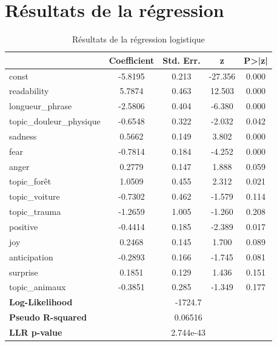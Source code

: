 \documentclass[12pt,a4paper,oneside,titlepage]{book} %
\begin{document}
\section{Résultats de la régression}
\begin{table}[htbp]
	\centering
	\caption{Résultats de la régression logistique}
	\begin{tabular}{lcccc}
		\toprule
		& \textbf{Coefficient} & \textbf{Std. Err.} & \textbf{z} & \textbf{P>|z|} \\
		\midrule
		const                        & -5.8195 & 0.213 & -27.356 & 0.000 \\
		readability & 5.7874  & 0.463 & 12.503  & 0.000 \\
		longueur\_phrase             & -2.5806 & 0.404 & -6.380  & 0.000 \\
		topic\_douleur\_physique                     & -0.6548 & 0.322 & -2.032  & 0.042 \\
		sadness                      & 0.5662  & 0.149 & 3.802   & 0.000 \\
		fear                         & -0.7814 & 0.184 & -4.252  & 0.000 \\
		anger                        & 0.2779  & 0.147 & 1.888   & 0.059 \\
		topic\_forêt                     & 1.0509  & 0.455 & 2.312   & 0.021 \\
		topic\_voiture                   & -0.7302 & 0.462 & -1.579  & 0.114 \\
		topic\_trauma                 & -1.2659 & 1.005 & -1.260  & 0.208 \\
		positive                     & -0.4414 & 0.185 & -2.389  & 0.017 \\
		joy                          & 0.2468  & 0.145 & 1.700   & 0.089 \\
		anticipation                 & -0.2893 & 0.166 & -1.745  & 0.081 \\
		surprise                     & 0.1851  & 0.129 & 1.436   & 0.151 \\
		topic\_animaux                     & -0.3851 & 0.285 & -1.349  & 0.177 \\
		\midrule
		\textbf{Log-Likelihood}      & \multicolumn{4}{c}{-1724.7} \\
		\textbf{Pseudo R-squared}    & \multicolumn{4}{c}{0.06516} \\
		\textbf{LLR p-value}         & \multicolumn{4}{c}{2.744e-43} \\
		\bottomrule
	\end{tabular}
	\label{table:logit}
\end{table}
\end{document}
